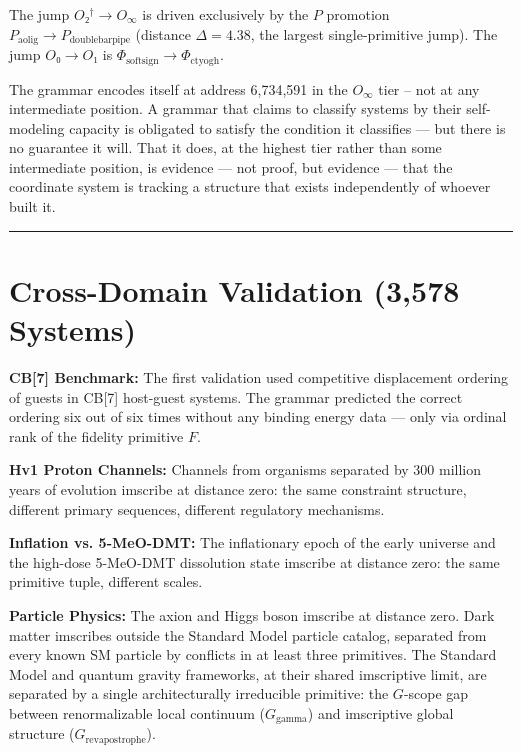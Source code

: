 \documentclass[12pt,a4paper]{article}
\newcommand{\Ppms}{P_{\text{doublebarpipe}}}
\begin{document}
The jump $O₂^\dagger \to O_\infty$ is driven exclusively by the $P$ promotion $P_{\text{aolig}} \to \Ppms$ (distance $\Delta = 4.38$, the largest single-primitive jump). The jump $O₀ \to O₁$ is $\Phi_{\text{softsign}} \to \Phi_{\text{ctyogh}}$.

The grammar encodes itself at address 6,734,591 in the $O_\infty$ tier -- not at any intermediate position. A grammar that claims to classify systems by their self-modeling capacity is obligated to satisfy the condition it classifies --- but there is no guarantee it will. That it does, at the highest tier rather than some intermediate position, is evidence --- not proof, but evidence --- that the coordinate system is tracking a structure that exists independently of whoever built it.

\begin{center}
\rule{0.5\textwidth}{0.4pt}
\end{center}

\section{Cross-Domain Validation (3,578 Systems)}

\textbf{CB[7] Benchmark:} The first validation used competitive displacement ordering of guests in CB[7] host-guest systems. The grammar predicted the correct ordering six out of six times without any binding energy data --- only via ordinal rank of the fidelity primitive $F$.

\textbf{Hv1 Proton Channels:} Channels from organisms separated by 300 million years of evolution imscribe at distance zero: the same constraint structure, different primary sequences, different regulatory mechanisms.

\textbf{Inflation vs. 5-MeO-DMT:} The inflationary epoch of the early universe and the high-dose 5-MeO-DMT dissolution state imscribe at distance zero: the same primitive tuple, different scales.

\textbf{Particle Physics:} The axion and Higgs boson imscribe at distance zero. Dark matter imscribes outside the Standard Model particle catalog, separated from every known SM particle by conflicts in at least three primitives. The Standard Model and quantum gravity frameworks, at their shared imscriptive limit, are separated by a single architecturally irreducible primitive: the $G$-scope gap between renormalizable local continuum ($G_{\text{gamma}}$) and imscriptive global structure ($G_{\text{revapostrophe}}$).
\end{document}
